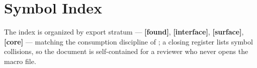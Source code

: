\documentclass[../main.tex]{subfiles}
\begin{document}
%
%
%

\section{Symbol Index}
\label{app:attestation:symbols}

The index is organized by export stratum --- \textbf{[found]}, \textbf{[interface]},
\textbf{[surface]}, \textbf{[core]} --- matching the consumption discipline of
; a closing register lists symbol collisions, so the
document is self-contained for a reviewer who never opens the macro file.
\end{document}
